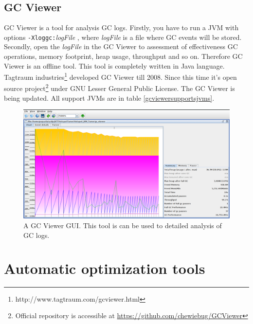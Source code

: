 \documentclass[
  digital, %
  oneside,
  notable, %
  nolof,     %
  nolot     %
]{fithesis3}
\begin{document}
\subsection{GC Viewer}
GC Viewer is a tool for analysis GC logs. Firstly, you have to run a JVM with options \texttt{-Xloggc:}\textit{logFile} \texttt{}, where \textit{logFile} is a file where GC events will be stored. Secondly, open the \textit{logFile} in the GC Viewer to assessment of effectiveness GC operations, memory footprint, heap usage, throughput and so on. Therefore GC Viewer is an offline tool.
This tool is completely written in Java language. Tagtraum industries\footnote{http://www.tagtraum.com/gcviewer.html} developed GC Viewer till 2008. Since this time it's open source project\footnote{Official repository is accessible at \url{https://github.com/chewiebug/GCViewer}} under GNU Lesser General Public License.\cite{gcviewer} The GC Viewer is being updated. All support JVMs are in table \ref{gcviewersupportsjvms}.

\begin{figure}[h]
	\centering
	\includegraphics[width=13cm]{fig/gcviewer.png}
	\caption{A GC Viewer GUI. This tool is can be used to detailed analysis of GC logs.}
	\label{gcviwer}
\end{figure}


\section{Automatic optimization tools}\label{autoopt}

\end{document}
